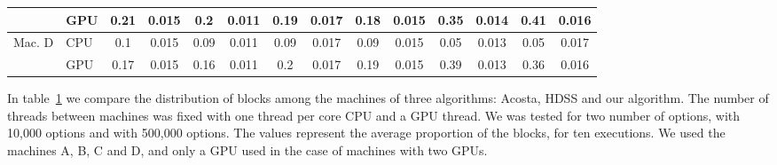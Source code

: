 \documentclass[journal]{IEEEtran}
\begin{document}
\begin{table}[htb]
\begin{scriptsize}
\begin{tabular}{|l|l|l|l|l|l|l|l|l|l|l|l|l|l|}
\cline{2-14}
 & GPU & \multicolumn{1}{c|}{0.21} & \multicolumn{1}{c|}{0.015} & \multicolumn{1}{c|}{0.2} & \multicolumn{1}{c|}{0.011} & \multicolumn{1}{c|}{0.19} & \multicolumn{1}{c|}{0.017} & \multicolumn{1}{c|}{0.18} & \multicolumn{1}{c|}{0.015} & \multicolumn{1}{c|}{0.35} & \multicolumn{1}{c|}{0.014} & \multicolumn{1}{c|}{0.41} & \multicolumn{1}{c|}{0.016} \\ 
\hline
Mac. D & CPU & \multicolumn{1}{c|}{0.1} & \multicolumn{1}{c|}{0.015} & \multicolumn{1}{c|}{0.09} & \multicolumn{1}{c|}{0.011} & \multicolumn{1}{c|}{0.09} & \multicolumn{1}{c|}{0.017} & \multicolumn{1}{c|}{0.09} & \multicolumn{1}{c|}{0.015} & \multicolumn{1}{c|}{0.05} & \multicolumn{1}{c|}{0.013} & \multicolumn{1}{c|}{0.05} & \multicolumn{1}{c|}{0.017} \\ 
\cline{2-14}
 & GPU & \multicolumn{1}{c|}{0.17} & \multicolumn{1}{c|}{0.015} & \multicolumn{1}{c|}{0.16} & \multicolumn{1}{c|}{0.011} & \multicolumn{1}{c|}{0.2} & \multicolumn{1}{c|}{0.017} & \multicolumn{1}{c|}{0.19} & \multicolumn{1}{c|}{0.015} & \multicolumn{1}{c|}{0.39} & \multicolumn{1}{c|}{0.013} & \multicolumn{1}{c|}{0.36} & \multicolumn{1}{c|}{0.016} \\ 
\hline
\end{tabular}
\end{scriptsize}
\label{table: comparativoBlack}
\end{table}

In table~\ref{table: comparativoBlack} we compare the distribution of blocks among the machines of three algorithms: Acosta, HDSS and our algorithm. The number of threads between machines was fixed with one thread per core CPU and a GPU thread. We was tested for two number of options, with 10,000 options and with 500,000 options. The values ​​represent the average proportion of the blocks, for ten executions. We used the machines A, B, C and D, and only a GPU used in the case of machines with two GPUs.
\end{document}

